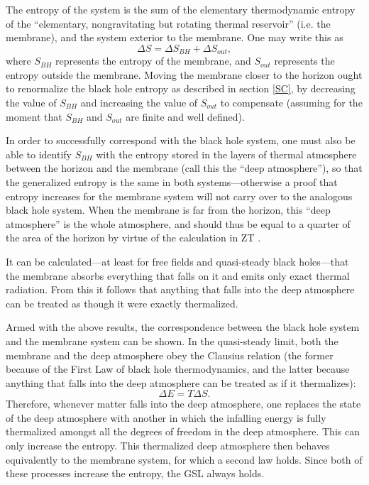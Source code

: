 \documentclass{article}
\begin{document}
The entropy of the system is the sum of the elementary thermodynamic entropy of the ``elementary, nongravitating but rotating thermal reservoir'' (i.e. the membrane), and the system exterior to the membrane.  One may write this as
\begin{equation}\label{sep}
\Delta S = \Delta S_{BH} + \Delta S_{out},
\end{equation}
where $S_{BH}$ represents the entropy of the membrane, and $S_{out}$ represents the entropy outside the membrane.  Moving the membrane closer to the horizon ought to renormalize the black hole entropy as described in section \ref{SC}, by decreasing the value of $S_{BH}$ and increasing the value of $S_{out}$ to compensate (assuming for the moment that $S_{BH}$ and $S_{out}$ are finite and well defined).

In order to successfully correspond with the black hole system, one must also be able to identify $S_{BH}$ with the entropy stored in the layers of thermal atmosphere between the horizon and the membrane (call this the ``deep atmosphere''), so that the generalized entropy is the same in both systems---otherwise a proof that entropy increases for the membrane system will not carry over to the analogous black hole system.  When the membrane is far from the horizon, this ``deep atmosphere'' is the whole atmosphere, and should thus be equal to a quarter of the area of the horizon by virtue of the calculation in ZT \cite{ZT85}.

It can be calculated---at least for free fields and quasi-steady black holes---that the membrane absorbs everything that falls on it and emits only exact thermal radiation.  From this it follows that anything that falls into the deep atmosphere can be treated as though it were exactly thermalized.

Armed with the above results, the correspondence between the black hole system and the membrane system can be shown.  In the quasi-steady limit, both the membrane and the deep atmosphere obey the Clausius relation (the former because of the First Law of black hole thermodynamics, and the latter because anything that falls into the deep atmosphere can be treated as if it thermalizes):
\begin{equation}
\Delta E = T \Delta S.
\end{equation}
Therefore, whenever matter falls into the deep atmosphere, one replaces the state of the deep atmosphere with another in which the infalling energy is fully thermalized amongst all the degrees of freedom in the deep atmosphere.  This can only increase the entropy.  This thermalized deep atmosphere then behaves equivalently to the membrane system, for which a second law holds.  Since both of these processes increase the entropy, the GSL always holds.
\end{document}
